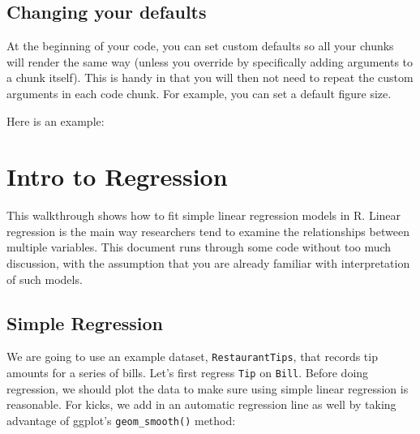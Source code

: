 \documentclass[
  letterpaper,
  DIV=11,
  numbers=noendperiod]{scrreprt}
\newenvironment{Shaded}{}{}
\newcommand{\AttributeTok}[1]{\textcolor[rgb]{0.49,0.56,0.16}{#1}}
\newcommand{\ConstantTok}[1]{\textcolor[rgb]{0.53,0.00,0.00}{#1}}
\newcommand{\DecValTok}[1]{\textcolor[rgb]{0.25,0.63,0.44}{#1}}
\newcommand{\FunctionTok}[1]{\textcolor[rgb]{0.02,0.16,0.49}{#1}}
\newcommand{\NormalTok}[1]{#1}
\newcommand{\SpecialCharTok}[1]{\textcolor[rgb]{0.25,0.44,0.63}{#1}}
\newcommand{\StringTok}[1]{\textcolor[rgb]{0.25,0.44,0.63}{#1}}
\begin{document}
\section{Changing your defaults}\label{changing-your-defaults}

At the beginning of your code, you can set custom defaults so all your
chunks will render the same way (unless you override by specifically
adding arguments to a chunk itself). This is handy in that you will then
not need to repeat the custom arguments in each code chunk. For example,
you can set a default figure size.

Here is an example:

\begin{Shaded}
\end{Shaded}

\chapter{Intro to Regression}\label{intro-to-regression}

This walkthrough shows how to fit simple linear regression models in R.
Linear regression is the main way researchers tend to examine the
relationships between multiple variables. This document runs through
some code without too much discussion, with the assumption that you are
already familiar with interpretation of such models.

\section{Simple Regression}\label{simple-regression}

We are going to use an example dataset, \texttt{RestaurantTips}, that
records tip amounts for a series of bills. Let's first regress
\texttt{Tip} on \texttt{Bill}. Before doing regression, we should plot
the data to make sure using simple linear regression is reasonable. For
kicks, we add in an automatic regression line as well by taking
advantage of ggplot's \texttt{geom\_smooth()} method:
\end{document}
